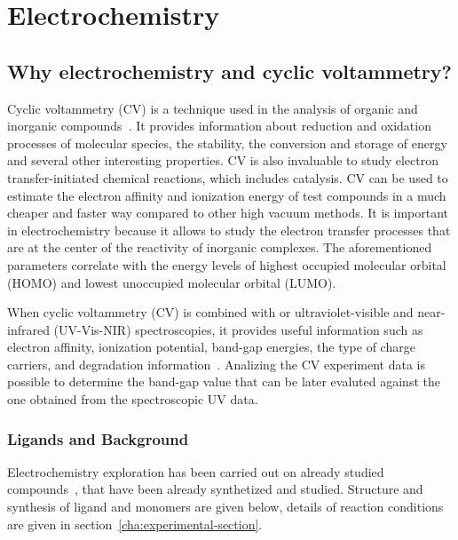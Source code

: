 \documentclass[../Master.tex]{subfiles}
\begin{document}

\newpage\section{Electrochemistry}\label{sec:electrochemistry}

\subsection{Why electrochemistry and cyclic voltammetry?}\label{sec:elect-intro}

Cyclic voltammetry (CV) is a technique used in the analysis of organic and inorganic compounds\ \cite{elgrishi_practical_2018}. It provides information about reduction and oxidation processes of molecular species, the stability, the conversion and storage of energy and several other interesting properties. CV is also invaluable to study electron transfer-initiated chemical reactions, which includes catalysis. CV can be used to estimate the electron affinity and ionization energy of test compounds in a much cheaper and faster way compared to other high vacuum methods. It is important in electrochemistry because it allows to study the electron transfer processes that are at the center of the reactivity of inorganic complexes.
The aforementioned parameters correlate with the energy levels of highest occupied molecular orbital (HOMO) and lowest unoccupied molecular orbital (LUMO).

When cyclic voltammetry (CV) is combined with or ultraviolet-visible and near-infrared (UV-Vis-NIR) spectroscopies, it provides useful information such as electron affinity, ionization potential, band-gap energies, the type of charge carriers, and degradation information\ \cite{pluczyk_using_2018}. Analizing the CV experiment data is possible to determine the band-gap value that can be later evaluted against the one obtained from the spectroscopic UV data.

\subsubsection{Ligands and  Background}
Electrochemistry exploration has been carried out on already studied compounds\ \cite{carlucci_heterometallic_2010}, that have been already synthetized and studied. Structure and synthesis of ligand and monomers  are given below, details of reaction conditions are given in section\ \ref{cha:experimental-section}.
\end{document}

